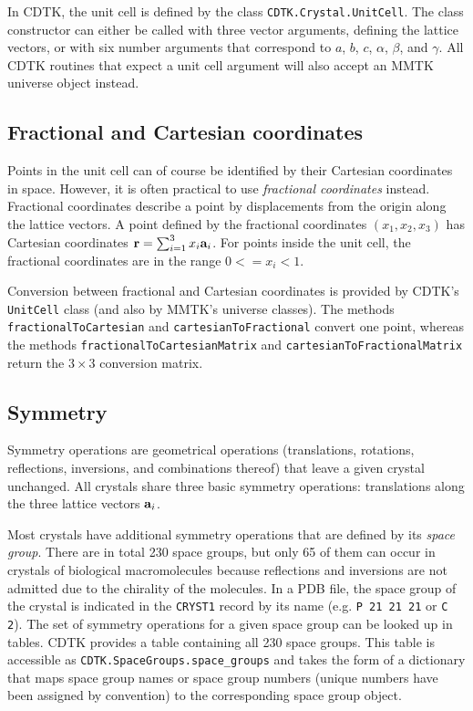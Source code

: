 \documentclass[12pt]{article}
\newcommand{\vect}[1]{{\bf #1}}
\newcommand{\va}{\vect{a}}
\begin{document}
\begin{sloppy}
In CDTK, the unit cell is defined by the class
\texttt{CDTK.Crystal.UnitCell}. The class constructor can either be
called with three vector arguments, defining the lattice vectors, or
with six number arguments that correspond to $a$, $b$, $c$, $\alpha$,
$\beta$, and $\gamma$. All CDTK routines that expect a unit cell
argument will also accept an MMTK universe object instead.

\subsection{Fractional and Cartesian coordinates}

Points in the unit cell can of course be identified by their Cartesian
coordinates in space. However, it is often practical to use
\textit{fractional coordinates} instead. Fractional coordinates
describe a point by displacements from the origin along the lattice
vectors. A point defined by the fractional coordinates $(x_1, x_2, x_3)$
has Cartesian coordinates $\vect{r} = \sum_{i=1}^3 x_i\va_i$.
For points inside the unit cell, the fractional coordinates are in the
range $0 <= x_i < 1$.

Conversion between fractional and Cartesian coordinates is provided by
CDTK's \texttt{UnitCell} class (and also by MMTK's universe classes).
The methods \texttt{fractionalToCartesian} and
\texttt{cartesianToFractional} convert one point, whereas the methods
\texttt{fractionalToCartesianMatrix} and
\texttt{cartesianToFractionalMatrix} return the $3 \times 3$
conversion matrix.

\subsection{Symmetry}

Symmetry operations are geometrical operations (translations,
rotations, reflections, inversions, and combinations thereof) that
leave a given crystal unchanged. All crystals share three basic
symmetry operations: translations along the three lattice vectors
$\va_i$.

Most crystals have additional symmetry operations that are defined by
its \textit{space group}. There are in total 230 space groups, but
only 65 of them can occur in crystals of biological macromolecules
because reflections and inversions are not admitted due to the
chirality of the molecules. In a PDB file, the space group of the
crystal is indicated in the \texttt{CRYST1} record by its name (e.g.
\texttt{P 21 21 21} or \texttt{C 2}). The set of symmetry operations
for a given space group can be looked up in tables. CDTK provides a
table containing all 230 space groups. This table is accessible as
\texttt{CDTK.SpaceGroups.space\_groups} and takes the form of a
dictionary that maps space group names or space group numbers (unique
numbers have been assigned by convention) to the corresponding space
group object.


\end{sloppy}
\end{document}
